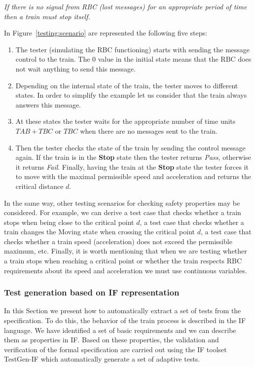 \documentclass{template/openetcs_article}
\begin{document}


\textit{If there is no signal from RBC (lost messages) for an appropriate period of time then a train must stop itself.}

In Figure~\ref{testing:scenario} are represented the following five steps:

\begin{enumerate}
\item The tester (simulating the RBC functioning) starts with sending the message control to the train. The 0 value in the initial state means that the RBC does not wait anything to send this message.
\item Depending on the internal state of the train, the tester moves to different states. In order to simplify the example let us consider that the train always answers this message.
\item At these states the tester waits for the appropriate number of time units $TAB + TBC$ or $TBC$ when there are no messages sent to the train.
\item Then the tester checks the state of the train by sending the control message again.
 If the train is in the \textbf{Stop} state then the tester returns \textit{Pass}, otherwise it returns \textit{Fail}. Finally, having the train at the \textbf{Stop} state the tester forces it to move with the maximal permissible speed and acceleration and returns the critical distance $d$.
\end{enumerate}
 
In the same way, other testing scenarios for checking safety properties may be considered. For example, we can derive a test case that checks whether a train stops when being close to the critical point $d$, a test case that checks whether a train changes the Moving state when crossing the critical point $d$, a test case that checks whether a train speed (acceleration) does not exceed the permissible maximum, etc. Finally, it is worth mentioning that when we are testing whether a train stops when reaching a critical point or whether the train respects RBC requirements about its speed and acceleration we must use continuous variables.

\subsubsection{Test generation based on IF representation}

In this Section we present how to automatically extract a set of tests from the specification. To do this, the behavior of the train process is described in the IF language. We have identified a set of basic requirements and we can describe them as properties in IF.  Based on these properties, the validation and verification of the formal specification are carried out using the IF toolset TestGen-IF which automatically generate a set of adaptive tests.
\end{document}
